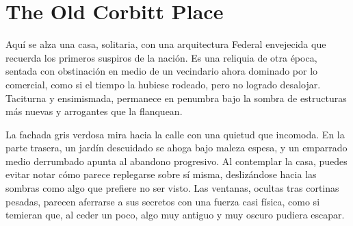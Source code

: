 \section{The Old Corbitt Place}

Aquí se alza una casa, solitaria, con una arquitectura Federal envejecida que
recuerda los primeros suspiros de la nación. Es una reliquia de otra época,
sentada con obstinación en medio de un vecindario ahora dominado por lo
comercial, como si el tiempo la hubiese rodeado, pero no logrado desalojar.
Taciturna y ensimismada, permanece en penumbra bajo la sombra de estructuras
más nuevas y arrogantes que la flanquean.

La fachada gris verdosa mira hacia la calle con una quietud que incomoda. En la
parte trasera, un jardín descuidado se ahoga bajo maleza espesa, y un emparrado
medio derrumbado apunta al abandono progresivo. Al contemplar la casa, puedes
evitar notar cómo parece replegarse sobre sí misma, deslizándose hacia las
sombras como algo que prefiere no ser visto. Las ventanas, ocultas tras
cortinas pesadas, parecen aferrarse a sus secretos con una fuerza casi física,
como si temieran que, al ceder un poco, algo muy antiguo y muy oscuro pudiera
escapar.
